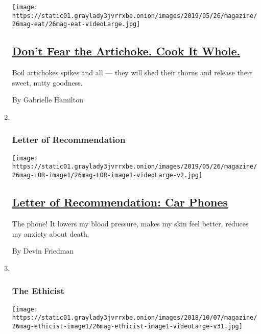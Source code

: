 \begin{enumerate}
  \texttt{[image: https://static01.graylady3jvrrxbe.onion/images/2019/05/26/magazine/26mag-eat/26mag-eat-videoLarge.jpg]}

  \hypertarget{dont-fear-the-artichoke-cook-it-whole}{%
  \subsection{\texorpdfstring{\href{/2019/05/22/magazine/dont-fear-the-artichoke-cook-it-whole.html}{Don't
  Fear the Artichoke. Cook It
  Whole.}}{Don't Fear the Artichoke. Cook It Whole.}}\label{dont-fear-the-artichoke-cook-it-whole}}

  Boil artichokes spikes and all --- they will shed their thorns and
  release their sweet, nutty goodness.

  By Gabrielle Hamilton
\item ~
  \hypertarget{letter-of-recommendation}{%
  \subsubsection{Letter of
  Recommendation}\label{letter-of-recommendation}}

  \texttt{[image: https://static01.graylady3jvrrxbe.onion/images/2019/05/26/magazine/26mag-LOR-image1/26mag-LOR-image1-videoLarge-v2.jpg]}

  \hypertarget{letter-of-recommendation-car-phones}{%
  \subsection{\texorpdfstring{\href{/2019/05/21/magazine/letter-of-recommendation-car-phones.html}{Letter
  of Recommendation: Car
  Phones}}{Letter of Recommendation: Car Phones}}\label{letter-of-recommendation-car-phones}}

  The phone! It lowers my blood pressure, makes my skin feel better,
  reduces my anxiety about death.

  By Devin Friedman
\item ~
  \hypertarget{the-ethicist}{%
  \subsubsection{The Ethicist}\label{the-ethicist}}

  \texttt{[image: https://static01.graylady3jvrrxbe.onion/images/2018/10/07/magazine/26mag-ethicist-image1/26mag-ethicist-image1-videoLarge-v31.jpg]}

  \hypertarget{im-an-ethical-vegan-can-i-pay-for-a-clients-carnivorous-meal}{%
}
\end{enumerate}
